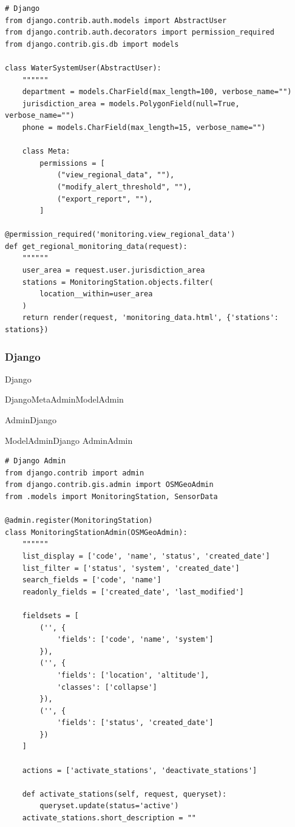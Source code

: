 \begin{lstlisting}[style=python]
# Django
from django.contrib.auth.models import AbstractUser
from django.contrib.auth.decorators import permission_required
from django.contrib.gis.db import models

class WaterSystemUser(AbstractUser):
    """"""
    department = models.CharField(max_length=100, verbose_name="")
    jurisdiction_area = models.PolygonField(null=True, verbose_name="")
    phone = models.CharField(max_length=15, verbose_name="")
    
    class Meta:
        permissions = [
            ("view_regional_data", ""),
            ("modify_alert_threshold", ""),
            ("export_report", ""),
        ]

@permission_required('monitoring.view_regional_data')
def get_regional_monitoring_data(request):
    """"""
    user_area = request.user.jurisdiction_area
    stations = MonitoringStation.objects.filter(
        location__within=user_area
    )
    return render(request, 'monitoring_data.html', {'stations': stations})
\end{lstlisting}

\hypertarget{django-2}{%
\subsubsection{Django}\label{django-2}}

Django

\important{}DjangoMetaAdminModelAdmin

\important{}AdminDjango

\important{}ModelAdminDjango AdminAdmin

\begin{lstlisting}[style=python]
# Django Admin
from django.contrib import admin
from django.contrib.gis.admin import OSMGeoAdmin
from .models import MonitoringStation, SensorData

@admin.register(MonitoringStation)
class MonitoringStationAdmin(OSMGeoAdmin):
    """"""
    list_display = ['code', 'name', 'status', 'created_date']
    list_filter = ['status', 'system', 'created_date']
    search_fields = ['code', 'name']
    readonly_fields = ['created_date', 'last_modified']
    
    fieldsets = [
        ('', {
            'fields': ['code', 'name', 'system']
        }),
        ('', {
            'fields': ['location', 'altitude'],
            'classes': ['collapse']
        }),
        ('', {
            'fields': ['status', 'created_date']
        })
    ]
    
    actions = ['activate_stations', 'deactivate_stations']
    
    def activate_stations(self, request, queryset):
        queryset.update(status='active')
    activate_stations.short_description = ""
\end{lstlisting}

